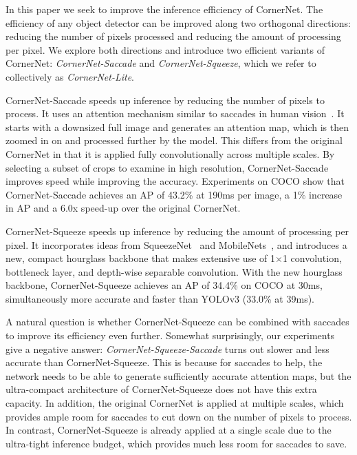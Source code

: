 \documentclass{bmvc2k}
\begin{document}
In this paper we seek to improve the inference efficiency of CornerNet. The efficiency of any object detector can be improved along two orthogonal directions: reducing the number of pixels processed and reducing the amount of processing per pixel. We explore both directions and introduce two efficient variants of CornerNet: \emph{CornerNet-Saccade} and \emph{CornerNet-Squeeze}, which we refer to collectively as \emph{CornerNet-Lite}. 

CornerNet-Saccade speeds up inference by reducing the number of pixels to process. It uses an attention mechanism similar to saccades in human vision~\cite{yarbus2013eye,bahill1975main}. It starts with a downsized full image and generates an attention map, which is then zoomed in on and processed further by the model. This differs from the original CornerNet in that it is applied fully convolutionally across multiple scales. By selecting a subset of crops to examine in high resolution, CornerNet-Saccade improves speed while improving the accuracy. Experiments on COCO show that CornerNet-Saccade achieves an AP of 43.2\% at 190ms per image, a 1\% increase in AP and a 6.0x speed-up over the original CornerNet. 

CornerNet-Squeeze speeds up inference by reducing the amount of processing per pixel. It incorporates ideas from SqueezeNet~\cite{iandola2016squeezenet} and MobileNets~\cite{howard2017mobilenets}, and introduces a new, compact hourglass backbone that makes extensive use of 1$\times$1 convolution, bottleneck layer, and depth-wise separable convolution. With the new hourglass backbone, CornerNet-Squeeze achieves an AP of 34.4\% on COCO at 30ms, simultaneously more accurate and faster than YOLOv3 (33.0\% at 39ms). 

A natural question is whether CornerNet-Squeeze can be combined with saccades to improve its efficiency even further. Somewhat surprisingly, our experiments give a negative answer: \emph{CornerNet-Squeeze-Saccade} turns out slower and less accurate than CornerNet-Squeeze. This is because for saccades to help, the network needs to be able to generate sufficiently accurate attention maps, but the ultra-compact architecture of CornerNet-Squeeze does not have this extra capacity. In addition, the original CornerNet is applied at multiple scales, which provides ample room for saccades to cut down on the number of pixels to process. In contrast, CornerNet-Squeeze is already applied at a single scale due to the ultra-tight inference budget, which provides much less room for saccades to save. 
\end{document}
